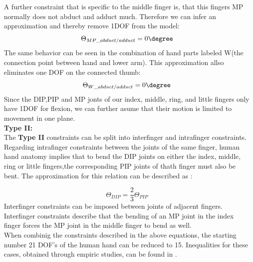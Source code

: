 A further constraint that is specific to the middle finger is, that this fingers MP normally does not abduct and adduct much. Therefore we can infer an approximation and thereby remove 1DOF from the model:
\begin{equation}
\Theta _{MP\_abduct/adduct}=0\degree
\end{equation}
The same behavior can be seen in the combination of hand parts labeled W(the connection point between hand and lower arm). This approximation allso eliminates one DOF on the connected thumb:
\begin{equation}
\Theta _{W\_abduct/adduct}=0\degree
\end{equation}
Since the DIP,PIP and MP jonts of our index, middle, ring, and little fingers only have 1DOF for flexion, we can further asume that their motion is limited to movement in one plane. \\
\textbf{Type II:}\\
The \textbf{Type II} constraints can be split into interfinger and intrafinger constraints. Regarding intrafinger constraints between the joints of the same finger, human hand anatomy implies that to bend the DIP joints  on  either the index, middle, ring or little fingers,the corresponding PIP joints of thath finger must also be bent. The approximation for this relation\cite{Rijpkema.1991} can be described as :

\begin{equation}
\Theta _{DIP} =\frac{2}{3}\Theta _{PIP}
\end{equation}
Interfinger constraints can be imposed between joints of adjacent fingers. Interfinger constraints describe that the bending of an MP joint in the index finger forces the MP joint in the middle finger to bend as well.\\
 When combinig the constraints described in the above equations, the starting number 21 DOF's of the human hand can be reduced to 15. Inequalities for these cases, obtained through empiric studies, can be found in \citep{LEE.1995}.\\
